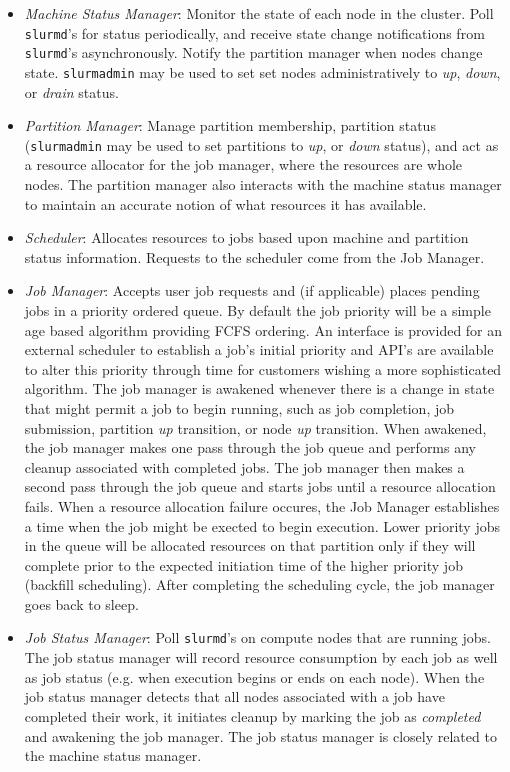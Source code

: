 \begin{itemize}
\item {\em Machine Status Manager}: Monitor the state of each 
node in the cluster.  Poll {\tt slurmd}'s for status periodically, and 
receive state change notifications from {\tt slurmd}'s asynchronously.
Notify the partition manager when nodes change state.
{\tt slurmadmin} may be used to set set nodes administratively to 
{\em up}, {\em down}, or {\em drain} status.

\item {\em Partition Manager}:  Manage partition membership, partition
status ({\tt slurmadmin} may be used to set
partitions to {\em up}, or {\em down} status), and
act as a resource allocator for the job manager, where the resources 
are whole nodes.  The partition manager also interacts with the machine 
status manager to maintain an accurate notion of what resources it has 
available.

\item {\em Scheduler}: Allocates resources to jobs based upon machine and 
partition status information. Requests to the scheduler come from the 
Job Manager.

\item {\em Job Manager}: Accepts user job requests and (if applicable) 
places pending jobs in a priority ordered queue. By default the job 
priority will be a simple age based algorithm providing FCFS ordering. 
An interface is provided for an external scheduler to establish 
a job's initial priority and API's are available to alter this priority 
through time for customers wishing a more sophisticated algorithm.
The job manager is awakened whenever there is a change in state that 
might permit a job to begin running, such as job completion, job submission, 
partition {\em up} transition, or node {\em up} transition.
When awakened, the job manager makes one pass through the job queue and
performs any cleanup associated with completed jobs.
The job manager then makes a second pass through the job queue and
starts jobs until a resource allocation fails. 
When a resource allocation failure occures, the Job Manager establishes 
a time when the job might be exected to begin execution. 
Lower priority jobs in the queue will be allocated resources on that 
partition only if they will complete prior to the expected initiation 
time of the higher priority job (backfill scheduling).
After completing the scheduling cycle, the job manager goes back to sleep.

\item {\em Job Status Manager}:
Poll {\tt slurmd}'s on compute nodes that are running jobs. 
The job status manager will record resource consumption by each job as 
well as job status (e.g. when execution begins or ends on each node). 
When the job status manager detects that all nodes associated with a 
job have completed 
their work, it initiates cleanup by marking the job as {\em completed} 
and awakening the job manager.  The job status manager is closely related to
the machine status manager.


\end{itemize}
